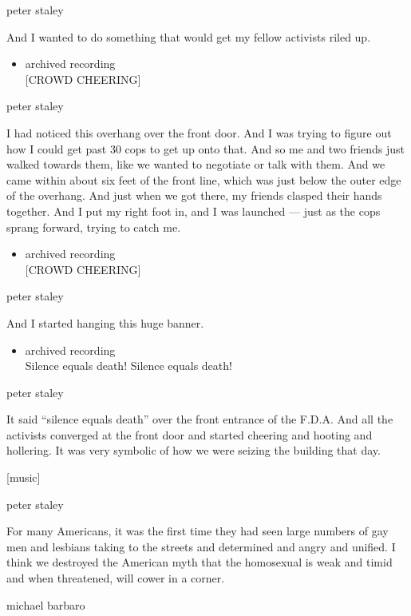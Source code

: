 peter staley

And I wanted to do something that would get my fellow activists riled
up.

\begin{itemize}
\tightlist
\item
  archived recording\\
  {[}CROWD CHEERING{]}
\end{itemize}

peter staley

I had noticed this overhang over the front door. And I was trying to
figure out how I could get past 30 cops to get up onto that. And so me
and two friends just walked towards them, like we wanted to negotiate or
talk with them. And we came within about six feet of the front line,
which was just below the outer edge of the overhang. And just when we
got there, my friends clasped their hands together. And I put my right
foot in, and I was launched --- just as the cops sprang forward, trying
to catch me.

\begin{itemize}
\tightlist
\item
  archived recording\\
  {[}CROWD CHEERING{]}
\end{itemize}

peter staley

And I started hanging this huge banner.

\begin{itemize}
\tightlist
\item
  archived recording\\
  Silence equals death! Silence equals death!
\end{itemize}

peter staley

It said ``silence equals death'' over the front entrance of the F.D.A.
And all the activists converged at the front door and started cheering
and hooting and hollering. It was very symbolic of how we were seizing
the building that day.

{[}music{]}

peter staley

For many Americans, it was the first time they had seen large numbers of
gay men and lesbians taking to the streets and determined and angry and
unified. I think we destroyed the American myth that the homosexual is
weak and timid and when threatened, will cower in a corner.

michael barbaro

